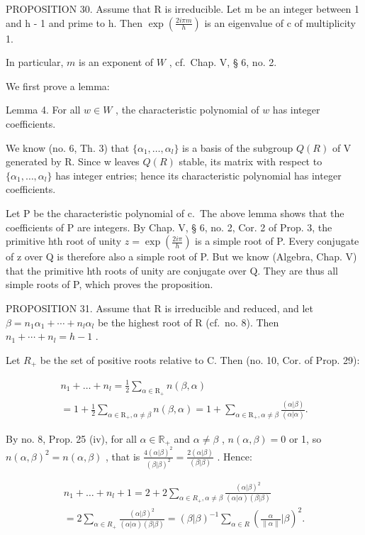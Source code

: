 PROPOSITION 30. Assume that R is irreducible. Let m be an integer between 1 and h - 1 and prime to h. Then \(\exp\left(\frac{2i\pi m}{h}\right)\) is an eigenvalue of c of multiplicity 1.

In particular, \(m\) is an exponent of \(W\) , cf.~Chap. V, § 6, no. 2.

We first prove a lemma:

Lemma 4. For all \(w \in W\) , the characteristic polynomial of \(w\) has integer coefficients.

We know (no. 6, Th. 3) that \(\{\alpha_{1},\ldots,\alpha_{l}\}\) is a basis of the subgroup \(Q(R)\) of V generated by R. Since w leaves \(Q(R)\) stable, its matrix with respect to \(\{\alpha_{1},\ldots,\alpha_{l}\}\) has integer entries; hence its characteristic polynomial has integer coefficients.

Let P be the characteristic polynomial of c.~The above lemma shows that the coefficients of P are integers. By Chap. V, § 6, no. 2, Cor. 2 of Prop. 3, the primitive hth root of unity \(z = \exp\left(\frac{2i\pi}{h}\right)\) is a simple root of P. Every conjugate of z over Q is therefore also a simple root of P. But we know (Algebra, Chap. V) that the primitive hth roots of unity are conjugate over Q. They are thus all simple roots of P, which proves the proposition.

PROPOSITION 31. Assume that R is irreducible and reduced, and let \(\beta = n_{1}\alpha_{1} + \cdots + n_{l}\alpha_{l}\) be the highest root of R (cf.~no. 8). Then \(n_{1} + \cdots + n_{l} = h - 1\) .

Let \(R_{+}\) be the set of positive roots relative to C. Then (no. 10, Cor. of Prop. 29):

\[
\begin{array}{l} n _ {1} + \dots + n _ {l} = \frac {1}{2} \sum_ {\alpha \in \mathrm{R} _ {+}} n (\beta , \alpha) \\ = 1 + \frac {1}{2} \sum_ {\alpha \in \mathrm{R} _ {+}, \alpha \neq \beta} n (\beta , \alpha) = 1 + \sum_ {\alpha \in \mathrm{R} _ {+}, \alpha \neq \beta} \frac {(\alpha | \beta)}{(\alpha | \alpha)}. \end{array}
\]

By no. 8, Prop. 25 (iv), for all \(\alpha \in \mathbb{R}_+\) and \(\alpha \neq \beta\) , \(n(\alpha, \beta) = 0\) or 1, so \(n(\alpha, \beta)^2 = n(\alpha, \beta)\) , that is \(\frac{4(\alpha | \beta)^2}{(\beta | \beta)^2} = \frac{2(\alpha | \beta)}{(\beta | \beta)}\) . Hence:

\[
\begin{array}{l} n _ {1} + \dots + n _ {l} + 1 = 2 + 2 \sum_ {\alpha \in R _ {+}, \alpha \neq \beta} \frac {(\alpha | \beta) ^ {2}}{(\alpha | \alpha) (\beta | \beta)} \\ = 2 \sum_ {\alpha \in R _ {+}} \frac {(\alpha | \beta) ^ {2}}{(\alpha | \alpha) (\beta | \beta)} = (\beta | \beta) ^ {- 1} \sum_ {\alpha \in R} (\frac {\alpha}{\| \alpha \|} | \beta) ^ {2}. \end{array}
\]

